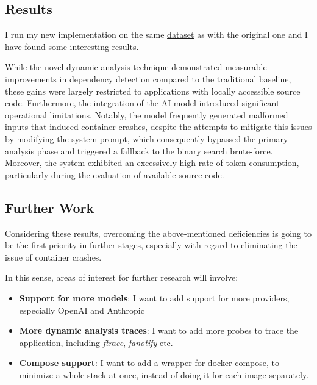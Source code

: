 
\subsection*{Results}

I run my new implementation on the same \href{https://github.com/ReGeLePuMa/testing}{dataset} as
with the original one and I have found some interesting results.

While the novel dynamic analysis technique demonstrated measurable improvements
in dependency detection compared to the traditional baseline, 
these gains were largely restricted to applications with locally accessible source code.
Furthermore, the integration of the AI model introduced significant operational limitations.
Notably, the model frequently generated malformed inputs that induced container crashes, despite
the attempts to mitigate this issues by modifying the system prompt, which consequently bypassed 
the primary analysis phase and triggered a fallback to the binary search brute-force. 
Moreover, the system exhibited an excessively high rate of token consumption, 
particularly during the evaluation of available source code.

\subsection*{Further Work}

Considering these results, overcoming the above-mentioned deficiencies is going to be 
the first priority in further stages, especially with regard to eliminating the issue of 
container crashes.

In this sense, areas of interest for further research will involve:
\begin{itemize}
    \item \textbf{Support for more models}: I want to add support for more providers, especially OpenAI and Anthropic
    \item \textbf{More dynamic analysis traces}: I want to add more probes to trace the application, including \textit{ftrace}, \textit{fanotify} etc.
    \item \textbf{Compose support}: I want to add a wrapper for docker compose, to minimize a whole stack at once, instead of doing it for each image separately.
\end{itemize}
